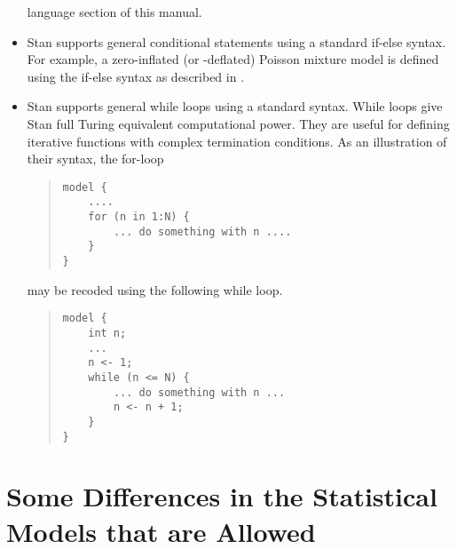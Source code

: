 \begin{itemize}
language section of this manual.
%
\item Stan supports general conditional statements using a standard
  if-else syntax.  For example, a zero-inflated (or -deflated) Poisson
  mixture model is defined using the if-else syntax as described in
  . 
%
\item Stan supports general while loops using a standard syntax.  
While loops give Stan full Turing equivalent computational power.
They are useful for defining iterative functions with complex
termination conditions.  As an illustration of their syntax,
the for-loop
%
\begin{quote}
\begin{Verbatim}[fontsize=\small]
model {
    ....
    for (n in 1:N) {
        ... do something with n ....
    }
}
\end{Verbatim}
\end{quote}
%
may be recoded using the following while loop.
%
\begin{quote}
\begin{Verbatim}[fontsize=\small]
model {
    int n;
    ...
    n <- 1;
    while (n <= N) {
        ... do something with n ...
        n <- n + 1;
    }
}
\end{Verbatim}
\end{quote}
%


\end{itemize}


\section{Some Differences in the Statistical Models that are Allowed}

